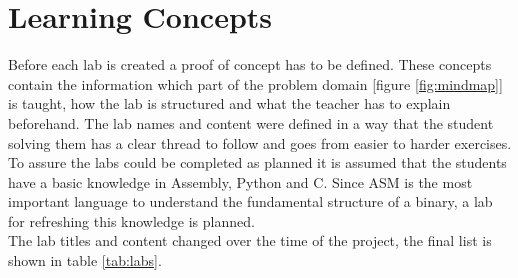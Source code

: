 \section{Learning Concepts}
Before each lab is created a proof of concept has to be defined. These concepts contain the information which part of the problem domain [figure \ref{fig:mindmap}] is taught, how the lab is structured and what the teacher has to explain beforehand. The lab names and content were defined in a way that the student solving them has a clear thread to follow and goes from easier to harder exercises. \\
To assure the labs could be completed as planned it is assumed that the students have a basic knowledge in Assembly, Python and C. Since ASM is the most important language to understand the fundamental structure of a binary, a lab for refreshing this knowledge is planned.\\
The lab titles and content changed over the time of the project, the final list is shown in table \ref{tab:labs}.

